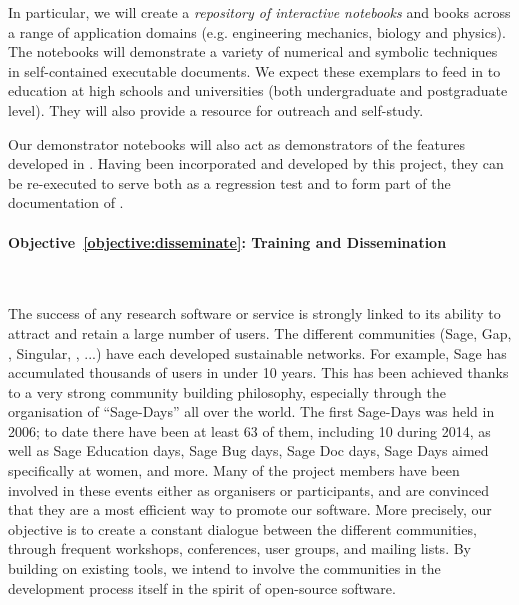 \documentclass[noworkareas,deliverables,\classoptions]{euproposal}       %
\begin{document}
\begin{proposal}
In particular, we will create a \emph{repository of interactive
  notebooks}  and books across a range
of application domains (e.g. engineering mechanics, biology and
physics). The notebooks will demonstrate a variety of numerical and
symbolic techniques in self-contained executable documents. We expect
these exemplars to feed in to education at high schools and
universities (both undergraduate and postgraduate level). They will
also provide a resource for outreach and self-study.

Our demonstrator notebooks will also act as demonstrators of the
features developed in \TheProject. Having been incorporated and
developed by this project, they can be re-executed to serve both as a
regression test and to form part of the documentation of \TheProject.



\paragraph{Objective~\ref{objective:disseminate}: Training and Dissemination}\ 

The success of any research software or service is strongly linked to
its ability to attract and retain a large number of users. The
different communities (Sage, Gap, \PariGP, Singular, \Jupyter, ...)
have each developed sustainable networks. For example, Sage has
accumulated thousands of users in under 10 years. This has been
achieved thanks to a very strong community building philosophy,
especially through the organisation of ``Sage-Days'' all over the
world. The first Sage-Days was held in 2006; to date there have been
at least 63 of them, including 10 during 2014, as well as Sage
Education days, Sage Bug days, Sage Doc days, Sage Days aimed
specifically at women, and more. Many of the \TheProject{} project
members have been involved in these events either as organisers or
participants, and are convinced that they are a most efficient way to
promote our software. More precisely, our objective is to create a
constant dialogue between the different communities, through frequent
workshops, conferences, user groups, and mailing lists. By building on
existing tools, we intend to involve the communities in the
development process itself in the spirit of open-source software.


\end{proposal}
\end{document}

